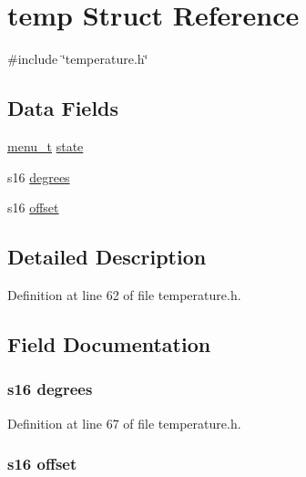 \hypertarget{structtemp}{\section{temp \-Struct \-Reference}
\label{structtemp}
}


{\ttfamily \#include \char`\"{}temperature.\-h\char`\"{}}

\subsection*{\-Data \-Fields}
\begin{DoxyCompactItemize}
\item 
\hyperlink{project_8h_a44455c5614c38dfadce594b2228fd055}{menu\-\_\-t} \hyperlink{structtemp_ac6b2518df4ca45cee089e61f152572b2}{state}
\item 
s16 \hyperlink{structtemp_ac7c37e8602d7154e8c1fda8a965a942c}{degrees}
\item 
s16 \hyperlink{structtemp_a0d9e2e9984f21129b2b54a114600b57b}{offset}
\end{DoxyCompactItemize}


\subsection{\-Detailed \-Description}


\-Definition at line 62 of file temperature.\-h.



\subsection{\-Field \-Documentation}
\hypertarget{structtemp_ac7c37e8602d7154e8c1fda8a965a942c}{
\subsubsection[{degrees}]{\setlength{\rightskip}{0pt plus 5cm}s16 {\bf degrees}}}\label{structtemp_ac7c37e8602d7154e8c1fda8a965a942c}


\-Definition at line 67 of file temperature.\-h.

\hypertarget{structtemp_a0d9e2e9984f21129b2b54a114600b57b}{
\subsubsection[{offset}]{\setlength{\rightskip}{0pt plus 5cm}s16 {\bf offset}}}\label{structtemp_a0d9e2e9984f21129b2b54a114600b57b}


